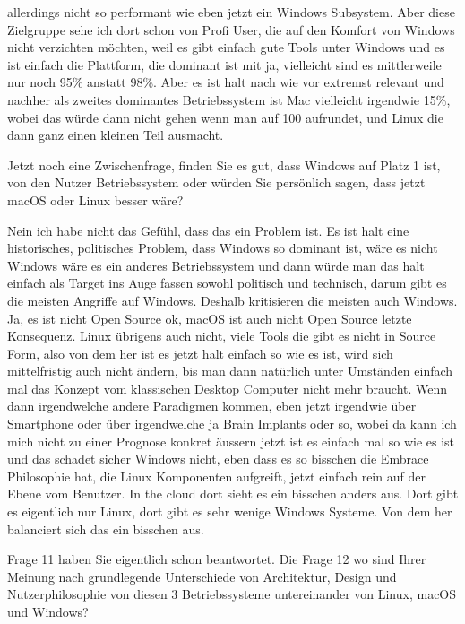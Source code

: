 \begin{description}
allerdings nicht so performant wie eben jetzt ein Windows Subsystem. Aber diese Zielgruppe sehe ich dort schon von Profi User, die auf den Komfort von Windows nicht verzichten möchten, weil es gibt einfach gute Tools unter Windows und es ist einfach die Plattform, die dominant ist mit ja, vielleicht sind es mittlerweile nur noch 95\% anstatt 98\%. Aber es ist halt nach wie vor extremst relevant und nachher als zweites dominantes Betriebssystem ist Mac vielleicht irgendwie 15\%, wobei das würde dann nicht gehen wenn man auf 100 aufrundet, und Linux die dann ganz einen kleinen Teil ausmacht.

\DS Jetzt noch eine Zwischenfrage, finden Sie es gut, dass Windows auf Platz 1 ist, von den Nutzer Betriebssystem oder würden Sie persönlich sagen, dass jetzt macOS oder Linux besser wäre?

\NH Nein ich habe nicht das Gefühl, dass das ein Problem ist. Es ist halt eine historisches, politisches Problem, dass Windows so dominant ist, wäre es nicht Windows wäre es ein anderes Betriebssystem und dann würde man das halt einfach als Target ins Auge fassen sowohl politisch und technisch, darum gibt es die meisten Angriffe auf Windows. Deshalb kritisieren die meisten auch Windows. Ja, es ist nicht Open Source ok, macOS ist auch nicht Open Source letzte Konsequenz. Linux übrigens auch nicht, viele Tools die gibt es nicht in Source Form, also von dem her ist es jetzt halt einfach so wie es ist, wird sich mittelfristig auch nicht ändern, bis man dann natürlich unter Umständen einfach mal das Konzept vom klassischen Desktop Computer nicht mehr braucht. Wenn dann irgendwelche andere Paradigmen kommen, eben jetzt irgendwie über Smartphone oder über irgendwelche ja Brain Implants oder so, wobei da kann ich mich nicht zu einer Prognose konkret äussern jetzt ist es einfach mal so wie es ist und das schadet sicher Windows nicht, eben dass es so bisschen die Embrace Philosophie hat, die Linux Komponenten aufgreift, jetzt einfach rein auf der Ebene vom Benutzer. In the cloud dort sieht es ein bisschen anders aus. Dort gibt es eigentlich nur Linux, dort gibt es sehr wenige Windows Systeme. Von dem her balanciert sich das ein bisschen aus.

\DS Frage 11 haben Sie eigentlich schon beantwortet. Die Frage 12 wo sind Ihrer Meinung nach grundlegende Unterschiede von Architektur, Design und Nutzerphilosophie von diesen 3 Betriebssysteme untereinander von Linux, macOS und Windows?


\end{description}
